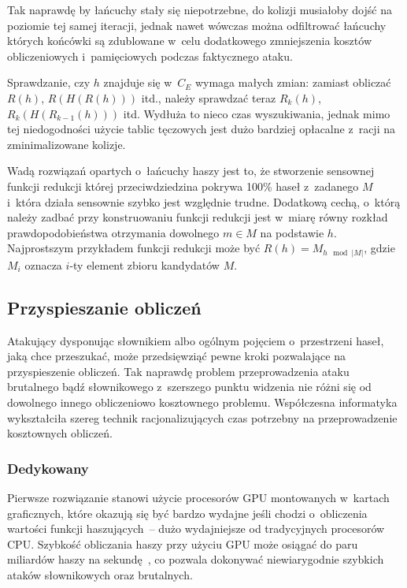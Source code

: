 Tak naprawdę by łańcuchy stały się niepotrzebne, do kolizji musiałoby dojść
na poziomie tej samej iteracji, jednak nawet wówczas można odfiltrować łańcuchy
których końcówki są zdublowane w~celu dodatkowego zmniejszenia kosztów
obliczeniowych i~pamięciowych podczas faktycznego ataku.

Sprawdzanie, czy $h$ znajduje się w~$C_E$ wymaga małych zmian: zamiast obliczać
$R(h)$, $R(H(R(h)))$ itd., należy sprawdzać teraz $R_k(h)$, $R_k(H(R_{k-1}(h)))$
itd. Wydłuża to nieco czas wyszukiwania, jednak mimo tej niedogodności użycie
tablic tęczowych jest dużo bardziej opłacalne z~racji na zminimalizowane
kolizje.

Wadą rozwiązań opartych o~łańcuchy haszy jest to, że stworzenie sensownej
funkcji redukcji której przeciwdziedzina pokrywa 100\% haseł z~zadanego $M$
i~która działa sensownie szybko jest względnie trudne. Dodatkową cechą, o~którą
należy zadbać przy konstruowaniu funkcji redukcji jest w~miarę równy rozkład
prawdopodobieństwa otrzymania dowolnego $m \in M$ na podstawie $h$.
Najprostszym przykładem funkcji redukcji może być $R(h) = M_{h \mod |M|}$,
gdzie $M_i$ oznacza $i$-ty element zbioru kandydatów $M$.



\subsection{Przyspieszanie obliczeń}
Atakujący dysponując słownikiem albo ogólnym pojęciem o~przestrzeni haseł, jaką
chce przeszukać, może przedsięwziąć pewne kroki pozwalające na przyspieszenie
obliczeń. Tak naprawdę problem przeprowadzenia ataku brutalnego bądź
słownikowego z~szerszego punktu widzenia nie różni się od dowolnego innego
obliczeniowo kosztownego problemu. Współczesna informatyka wykształciła szereg
technik racjonalizujących czas potrzebny na przeprowadzenie kosztownych
obliczeń.



\subsubsection{Dedykowany }

Pierwsze rozwiązanie stanowi użycie procesorów GPU montowanych w~kartach
graficznych, które okazują się być bardzo wydajne jeśli chodzi o~obliczenia
wartości funkcji haszujących~-- dużo wydajniejsze od tradycyjnych procesorów
CPU. Szybkość obliczania haszy przy użyciu GPU może osiągać do paru miliardów
haszy na sekundę~\cite{gpu_cracking_benchmarks}, co pozwala dokonywać
niewiarygodnie szybkich ataków słownikowych oraz brutalnych.


